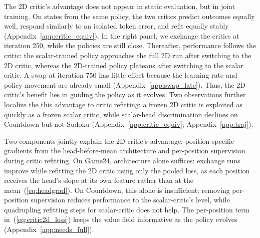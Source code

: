 The 2D critic's advantage does not appear in static evaluation, but in joint training. On states from the same policy, the two critics predict outcomes equally well, respond similarly to an isolated token error, and refit equally stably (Appendix~\ref{app:critic_equiv}). In the right panel, we exchange the critics at iteration 250, while the policies are still close. Thereafter, performance follows the critic: the scalar-trained policy approaches the full 2D run after switching to the 2D critic, whereas the 2D-trained policy plateaus after switching to the scalar critic. A swap at iteration 750 has little effect because the learning rate and policy movement are already small (Appendix~\ref{app:swap_late}). Thus, the 2D critic's benefit lies in guiding the policy as it evolves. Two observations further localize the this advantage to critic refitting: a frozen 2D critic is exploited as quickly as a frozen scalar critic, while scalar-head discrimination declines on Countdown but not Sudoku (Appendix~\ref{app:critic_equiv}; Appendix~\ref{app:traj}).

Two components jointly explain the 2D critic's advantage: position-specific gradients from the head-before-mean architecture and per-position supervision during critic refitting. On Game24, architecture alone suffices: exchange runs improve while refitting the 2D critic using only the pooled loss, as each position receives the head's slope at its own feature rather than at the mean~(\ref{eq:headgrad}). On Countdown, this alone is insufficient: removing per-position supervision reduces performance to the scalar-critic's level, while quadrupling refitting steps for scalar-critic does not help. The per-position term in~(\ref{eq:critic2d_loss}) keeps the value field informative as the policy evolves (Appendix~\ref{app:needs_full}).

